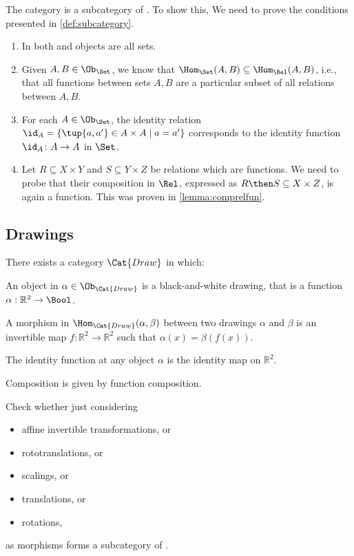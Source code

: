 \begin{example}
    The category \Set is a subcategory of \Rel. To show this, We need to prove the conditions presented in \cref{def:subcategory}.
	\begin{enumerate}
	\item In both \Rel and \Set objects are all sets.
	\item Given $A,B\in \Ob_{\Set}$, we know that $\Hom_{\Set}(A,B)\subseteq \Hom_{\Rel}(A,B)$, i.e., that all functions between sets $A,B$ are a particular subset of all relations between $A,B$.
	\item For each $A\in \Ob_{\Set}$, the identity relation $\id_A=\{\tup{a,a'}\in A\times A\mid a=a'\}$ corresponds to the identity function $\id_A\colon A\to A$ in $\Set$.
	\item Let $R\subseteq X\times Y$ and $S\subseteq Y\times Z$ be relations which are functions. We need to probe that their composition in $\Rel$, expressed as $R\then S\subseteq X\times Z$, is again a function. This was proven in \cref{lemma:comprelfun}.
	\end{enumerate}

\end{example}


\subsection{Drawings}

\newcommand{\Draw}{\Cat{Draw}}

\begin{definition}
There exists a category $\Draw$ in which:
\begin{compactenum}
\item An object in $\alpha\in \Ob_\Draw$ is a black-and-white drawing,
that is a function $\alpha : \mathbb{R}^2 \to \Bool$.
\item A morphism in $\Hom_{\Draw}(\alpha, \beta)$ between two drawings
$\alpha$ and $\beta$ is an invertible map $f: \mathbb{R}^2 \to \mathbb{R}^2$ such that
$\alpha(x) = \beta(f(x))$.
\item The identity function at any object $\alpha$ is the identity map 
on $\mathbb{R}^2$. 
\item Composition is given by function composition. 
\end{compactenum}
\end{definition}
 
 \begin{exercise}
Check whether just considering
    \begin{itemize}
        \item affine invertible transformations, or
        \item rototranslations, or
        \item scalings, or
        \item translations, or
        \item rotations,
    \end{itemize}
as morphisms forms a subcategory of \Draw.
 \end{exercise}
 
